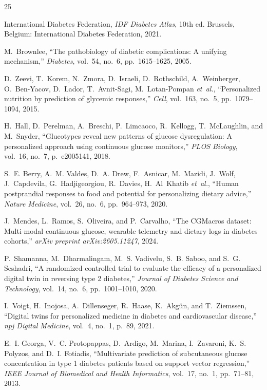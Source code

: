 \documentclass[conference]{IEEEtran}
\begin{document}
\begin{thebibliography}{25}

International Diabetes Federation, \emph{IDF Diabetes Atlas}, 10th ed. Brussels, Belgium: International Diabetes Federation, 2021.

M.~Brownlee, ``The pathobiology of diabetic complications: A unifying mechanism,'' \emph{Diabetes}, vol.~54, no.~6, pp.~1615--1625, 2005.

D.~Zeevi, T.~Korem, N.~Zmora, D.~Israeli, D.~Rothschild, A.~Weinberger, O.~Ben-Yacov, D.~Lador, T.~Avnit-Sagi, M.~Lotan-Pompan \emph{et~al.}, ``Personalized nutrition by prediction of glycemic responses,'' \emph{Cell}, vol.~163, no.~5, pp.~1079--1094, 2015.

H.~Hall, D.~Perelman, A.~Breschi, P.~Limcaoco, R.~Kellogg, T.~McLaughlin, and M.~Snyder, ``Glucotypes reveal new patterns of glucose dysregulation: A personalized approach using continuous glucose monitors,'' \emph{PLOS Biology}, vol.~16, no.~7, p.~e2005141, 2018.

S.~E. Berry, A.~M. Valdes, D.~A. Drew, F.~Asnicar, M.~Mazidi, J.~Wolf, J.~Capdevila, G.~Hadjigeorgiou, R.~Davies, H.~Al~Khatib \emph{et~al.}, ``Human postprandial responses to food and potential for personalizing dietary advice,'' \emph{Nature Medicine}, vol.~26, no.~6, pp.~964--973, 2020.

J.~Mendes, L.~Ramos, S.~Oliveira, and P.~Carvalho, ``The CGMacros dataset: Multi-modal continuous glucose, wearable telemetry and dietary logs in diabetes cohorts,'' \emph{arXiv preprint arXiv:2605.11247}, 2024.

P.~Shamanna, M.~Dharmalingam, M.~S. Vadivelu, S.~B. Saboo, and S.~G. Seshadri, ``A randomized controlled trial to evaluate the efficacy of a personalized digital twin in reversing type 2 diabetes,'' \emph{Journal of Diabetes Science and Technology}, vol.~14, no.~6, pp.~1001--1010, 2020.

I.~Voigt, H.~Inojosa, A.~Dillenseger, R.~Haase, K.~Akg{\"u}n, and T.~Ziemssen, ``Digital twins for personalized medicine in diabetes and cardiovascular disease,'' \emph{npj Digital Medicine}, vol.~4, no.~1, p.~89, 2021.

E.~I. Georga, V.~C. Protopappas, D.~Ardigo, M.~Marina, I.~Zavaroni, K.~S. Polyzos, and D.~I. Fotiadis, ``Multivariate prediction of subcutaneous glucose concentration in type 1 diabetes patients based on support vector regression,'' \emph{IEEE Journal of Biomedical and Health Informatics}, vol.~17, no.~1, pp.~71--81, 2013.


\end{thebibliography}
\end{document}
